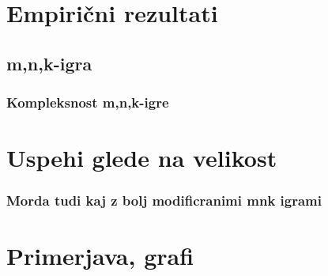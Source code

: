 \documentclass[12pt,a4paper]{amsart}
\theoremstyle{definition} %
\theoremstyle{plain} %
\begin{document}
\section{Empirični rezultati}

\subsection{m,n,k-igra}
\subsubsection{Kompleksnost m,n,k-igre}

\section{Uspehi glede na velikost}
\subsubsection{Morda tudi kaj z bolj modificranimi mnk igrami}

\section{Primerjava, grafi}
\end{document}
